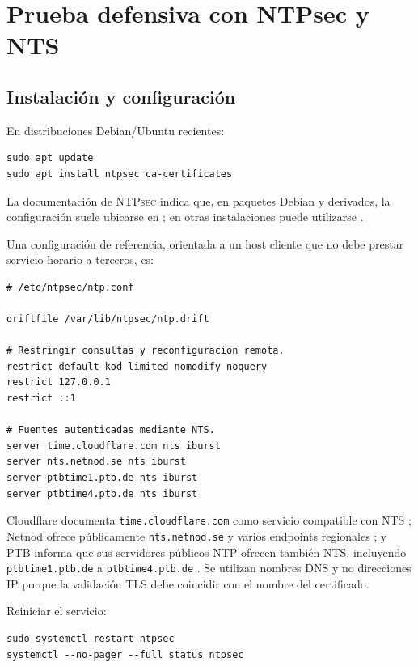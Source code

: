 \documentclass[11pt,a4paper]{article}
\newcommand{\ruta}[1]{\path{#1}}
\newcommand{\ntpsec}{\textsc{NTPsec}}
\begin{document}
\section{Prueba defensiva con NTPsec y NTS}

\subsection{Instalación y configuración}

En distribuciones Debian/Ubuntu recientes:

\begin{lstlisting}[style=terminal]
sudo apt update
sudo apt install ntpsec ca-certificates
\end{lstlisting}

La documentación de \ntpsec{} indica que, en paquetes Debian y derivados, la configuración suele ubicarse en \ruta{/etc/ntpsec/ntp.conf}; en otras instalaciones puede utilizarse \ruta{/etc/ntp.conf} \cite{ntpsecquick}.

Una configuración de referencia, orientada a un host cliente que no debe prestar servicio horario a terceros, es:

\begin{lstlisting}[style=terminal]
# /etc/ntpsec/ntp.conf

driftfile /var/lib/ntpsec/ntp.drift

# Restringir consultas y reconfiguracion remota.
restrict default kod limited nomodify noquery
restrict 127.0.0.1
restrict ::1

# Fuentes autenticadas mediante NTS.
server time.cloudflare.com nts iburst
server nts.netnod.se nts iburst
server ptbtime1.ptb.de nts iburst
server ptbtime4.ptb.de nts iburst
\end{lstlisting}

Cloudflare documenta \texttt{time.cloudflare.com} como servicio compatible con NTS \cite{cloudflarents}; Netnod ofrece públicamente \texttt{nts.netnod.se} y varios endpoints regionales \cite{netnodnts}; y PTB informa que sus servidores públicos NTP ofrecen también NTS, incluyendo \texttt{ptbtime1.ptb.de} a \texttt{ptbtime4.ptb.de} \cite{ptbnts}. Se utilizan nombres DNS y no direcciones IP porque la validación TLS debe coincidir con el nombre del certificado.

Reiniciar el servicio:

\begin{lstlisting}[style=terminal]
sudo systemctl restart ntpsec
systemctl --no-pager --full status ntpsec
\end{lstlisting}
\end{document}

